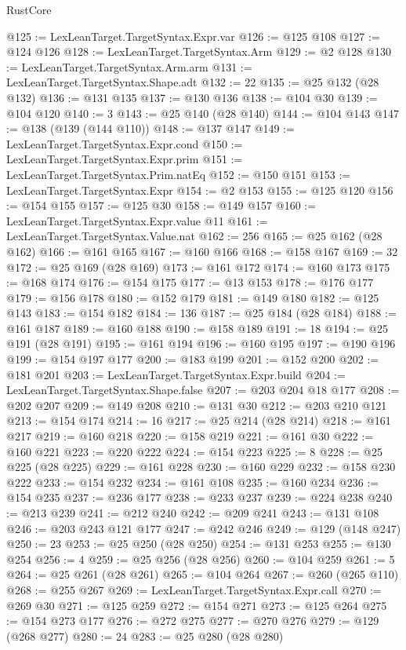 \begin{lexlean}{RustCore}
\begin{coremodule}
@125 := LexLeanTarget.TargetSyntax.Expr.var
@126 := @125 @108
@127 := @124 @126
@128 := LexLeanTarget.TargetSyntax.Arm
@129 := @2 @128
@130 := LexLeanTarget.TargetSyntax.Arm.arm
@131 := LexLeanTarget.TargetSyntax.Shape.adt
@132 := 22
@135 := @25 @132 (@28 @132)
@136 := @131 @135
@137 := @130 @136
@138 := @104 @30
@139 := @104 @120
@140 := 3
@143 := @25 @140 (@28 @140)
@144 := @104 @143
@147 := @138 (@139 (@144 @110))
@148 := @137 @147
@149 := LexLeanTarget.TargetSyntax.Expr.cond
@150 := LexLeanTarget.TargetSyntax.Expr.prim
@151 := LexLeanTarget.TargetSyntax.Prim.natEq
@152 := @150 @151
@153 := LexLeanTarget.TargetSyntax.Expr
@154 := @2 @153
@155 := @125 @120
@156 := @154 @155
@157 := @125 @30
@158 := @149 @157
@160 := LexLeanTarget.TargetSyntax.Expr.value @11
@161 := LexLeanTarget.TargetSyntax.Value.nat
@162 := 256
@165 := @25 @162 (@28 @162)
@166 := @161 @165
@167 := @160 @166
@168 := @158 @167
@169 := 32
@172 := @25 @169 (@28 @169)
@173 := @161 @172
@174 := @160 @173
@175 := @168 @174
@176 := @154 @175
@177 := @13 @153
@178 := @176 @177
@179 := @156 @178
@180 := @152 @179
@181 := @149 @180
@182 := @125 @143
@183 := @154 @182
@184 := 136
@187 := @25 @184 (@28 @184)
@188 := @161 @187
@189 := @160 @188
@190 := @158 @189
@191 := 18
@194 := @25 @191 (@28 @191)
@195 := @161 @194
@196 := @160 @195
@197 := @190 @196
@199 := @154 @197 @177
@200 := @183 @199
@201 := @152 @200
@202 := @181 @201
@203 := LexLeanTarget.TargetSyntax.Expr.build
@204 := LexLeanTarget.TargetSyntax.Shape.false
@207 := @203 @204 @18 @177
@208 := @202 @207
@209 := @149 @208
@210 := @131 @30
@212 := @203 @210 @121
@213 := @154 @174
@214 := 16
@217 := @25 @214 (@28 @214)
@218 := @161 @217
@219 := @160 @218
@220 := @158 @219
@221 := @161 @30
@222 := @160 @221
@223 := @220 @222
@224 := @154 @223
@225 := 8
@228 := @25 @225 (@28 @225)
@229 := @161 @228
@230 := @160 @229
@232 := @158 @230 @222
@233 := @154 @232
@234 := @161 @108
@235 := @160 @234
@236 := @154 @235
@237 := @236 @177
@238 := @233 @237
@239 := @224 @238
@240 := @213 @239
@241 := @212 @240
@242 := @209 @241
@243 := @131 @108
@246 := @203 @243 @121 @177
@247 := @242 @246
@249 := @129 (@148 @247)
@250 := 23
@253 := @25 @250 (@28 @250)
@254 := @131 @253
@255 := @130 @254
@256 := 4
@259 := @25 @256 (@28 @256)
@260 := @104 @259
@261 := 5
@264 := @25 @261 (@28 @261)
@265 := @104 @264
@267 := @260 (@265 @110)
@268 := @255 @267
@269 := LexLeanTarget.TargetSyntax.Expr.call
@270 := @269 @30
@271 := @125 @259
@272 := @154 @271
@273 := @125 @264
@275 := @154 @273 @177
@276 := @272 @275
@277 := @270 @276
@279 := @129 (@268 @277)
@280 := 24
@283 := @25 @280 (@28 @280)

\end{coremodule}
\end{lexlean}
